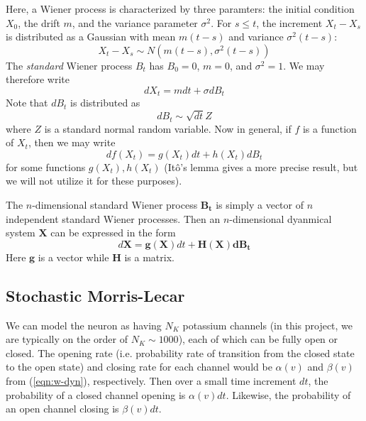\documentclass[letterpaper,12pt]{article}
\numberwithin{table}{section}
\numberwithin{figure}{section}
\numberwithin{equation}{section}
\begin{document}
\begin{flushleft}
    Here, a Wiener process is characterized by three paramters: the initial condition $X_0$, the drift $m$, and the variance parameter $\sigma^2$. For $s \leq t$, the increment $X_t - X_s$ is distributed as a Gaussian with mean $m(t - s)$ and variance $\sigma^2(t-s)$:
    \begin{equation}
        X_t - X_s \sim N\left(m(t - s), \sigma^2 (t - s)\right)
    \end{equation}
    The \textit{standard} Wiener process $B_t$ has $B_0 = 0$, $m = 0$, and $\sigma^2 = 1$. We may therefore write
    \begin{equation}
        dX_t = m dt + \sigma dB_t
    \end{equation}
    Note that $dB_t$ is distributed as
    \begin{equation}
        dB_t \sim \sqrt{dt}Z
    \end{equation}
    where $Z$ is a standard normal random variable. Now in general, if $f$ is a function of $X_t$, then we may write
    \begin{equation}
        df(X_t) = g(X_t) dt + h(X_t) dB_t
    \end{equation}
    for some functions $g(X_t), h(X_t)$ (It\^o's lemma gives a more precise result, but we will not utilize it for these purposes).

    The $n$-dimensional standard Wiener process $\mathbf{B_t}$ is simply a vector of $n$ independent standard Wiener processes. Then an $n$-dimensional dyanmical system $\mathbf{X}$ can be expressed in the form
    \begin{equation}
        \label{eqn:sde-general}
        d\mathbf{X} = \mathbf{g}(\mathbf{X}) dt + \mathbf{H}(\mathbf{X}) \mathbf{dB_t}
    \end{equation}
    Here $\mathbf{g}$ is a vector while $\mathbf{H}$ is a matrix.

    \subsection{Stochastic Morris-Lecar}

    We can model the neuron as having $N_K$ potassium channels (in this project, we are typically on the order of $N_K \sim 1000$), each of which can be fully open or closed. The opening rate (i.e. probability rate of transition from the closed state to the open state) and closing rate for each channel would be $\alpha(v)$ and $\beta(v)$ from (\ref{eqn:w-dyn}), respectively. Then over a small time increment $dt$, the probability of a closed channel opening is $\alpha(v) dt$. Likewise, the probability of an open channel closing is $\beta(v) dt$.


\end{flushleft}
\end{document}
